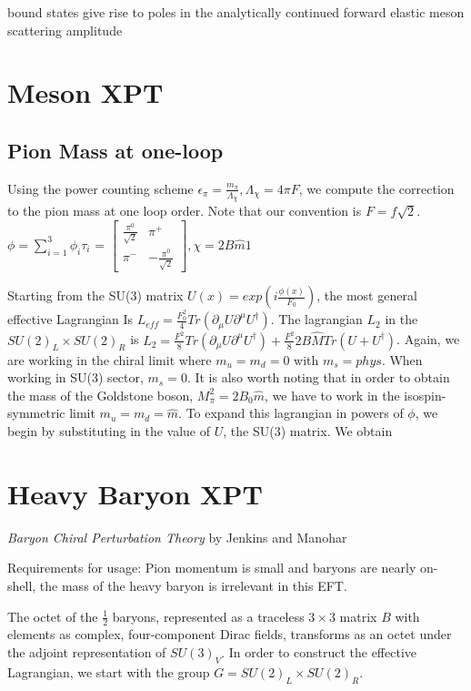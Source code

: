 \documentclass[12pt,tightenlines, raggedbottom, prd, notitlepage]{revtex4-1}
\begin{document}
bound states give rise to poles in the analytically continued forward elastic meson scattering amplitude 

\section*{Meson XPT}

\subsection*{Pion Mass at one-loop}
Using the power counting scheme $\epsilon_\pi = \frac{m_\pi}{\Lambda_\chi} , \Lambda_\chi = 4\pi F $, we compute 
the correction to the pion mass at one loop order. Note that our convention is $F=f\sqrt{2}$.
$\phi= \sum_{i=1}^{3}\phi_i\tau_i$ = $\begin{bmatrix}\frac{\pi^0}{\sqrt{2}} & \pi^+ \\ \pi^- & -\frac{\pi^0}{\sqrt{2}}\end{bmatrix},
 \chi = 2B\hat{m}1$

Starting from the SU(3) matrix $U(x) = exp(i\frac{\phi(x)}{F_0})$, the most general effective Lagrangian Is
$L_{eff} = \frac{F_0^2}{4} Tr(\partial_\mu U \partial^\mu U^\dagger)$. The lagrangian $L_2$ in the 
$SU(2)_L \times SU(2)_R$ is 
$ L_2 = \frac{F^2}{8}Tr(\partial_\mu U \partial^\mu U^\dagger) + \frac{F^2}{8}2B\hat{M}Tr(U + U^\dagger)$. Again,
we are working in the chiral limit where $m_u = m_d = 0$ with $m_s = phys$. When working in SU(3) sector, $m_s = 0$. It is 
also worth noting that in order to obtain the mass of the Goldstone boson, $M_\pi^2 = 2B_0\hat{m}$, we have to work in the 
isospin-symmetric limit $m_u = m_d = \hat{m}$.  
To expand this lagrangian in powers of $\phi$, we begin by substituting in the value of $U$, the SU(3) matrix. 
We obtain 



\section*{Heavy Baryon XPT}
\textit{Baryon Chiral Perturbation Theory} by Jenkins and Manohar

Requirements for usage: Pion momentum is small and baryons are nearly on-shell, the mass of the heavy baryon is irrelevant
in this EFT. 

The octet of the $\frac{1}{2}$ baryons, represented as a traceless $3 \times 3$ matrix $B$ with elements as
complex, four-component Dirac fields, transforms as an octet under the adjoint representation of 
$SU(3)_V$. In order to construct the effective Lagrangian, we start with the group $G = SU(2)_L \times SU(2)_R$.
\end{document}
